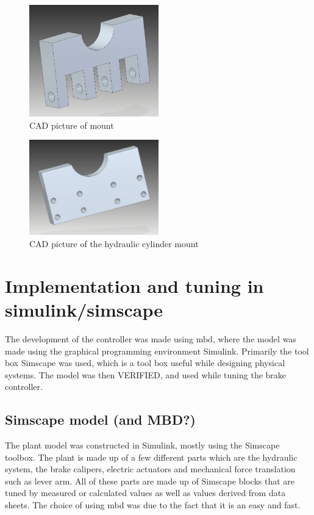 \documentclass[a4paper,11pt]{kth-mag}
\begin{document}
\begin{figure}[h]
\centering
\includegraphics[width=0.5\textwidth]{Actuator_mount}
\caption{CAD picture of mount}
\label{fig:CAD_Actuator_mount}
\end{figure}

\begin{figure}[h]
\centering
\includegraphics[width=0.5\textwidth]{Hydraulic_cylinder_mount}
\caption{CAD picture of the hydraulic cylinder mount}
\label{fig:CAD_Hydraulic_cylinder_mount}
\end{figure}



\section{Implementation and tuning in simulink/simscape}

The development of the controller was made using \gls{mbd}, where the model was made using the graphical programming environment Simulink. Primarily the tool box Simscape was used, which is a tool box useful while designing physical systems. The model was then VERIFIED, and used while tuning the brake controller. 

\subsection{Simscape model (and MBD?)}
The plant model was constructed in Simulink, mostly using the Simscape toolbox. The plant is made up of a few different parts which are the hydraulic system, the brake calipers, electric actuators and mechanical force translation such as lever arm. All of these parts are made up of Simscape blocks that are tuned by measured or calculated values  as well as values derived from data sheets. The choice of using \gls{mbd} was due to the fact that it is an easy and fast. 
\end{document}
